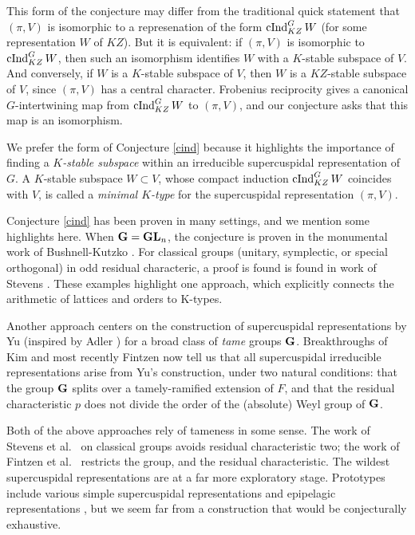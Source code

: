 \documentclass[letter]{amsart}
\theoremstyle{definition}
\theoremstyle{remark}
\numberwithin{thm}{section}
\numberwithin{equation}{section}
\begin{document}
This form of the conjecture may differ from the traditional quick statement that $(\pi, V)$ is isomorphic to a represenation of the form $\operatorname{cInd}_{KZ}^G W$ (for some representation $W$ of $KZ$).  But it is equivalent:  if $(\pi, V)$ is isomorphic to $\operatorname{cInd}_{KZ}^G W$, then such an isomorphism identifies $W$ with a $K$-stable subspace of $V$.  And conversely, if $W$ is a $K$-stable subspace of $V$, then $W$ is a $KZ$-stable subspace of $V$, since $(\pi, V)$ has a central character.  Frobenius reciprocity gives a canonical $G$-intertwining map from $\operatorname{cInd}_{KZ}^G W$ to $(\pi, V)$, and our conjecture asks that this map is an isomorphism.  

We prefer the form of Conjecture \ref{cind} because it highlights the importance of finding a {\em $K$-stable subspace} within an irreducible supercuspidal representation of $G$.  A $K$-stable subspace $W \subset V$, whose compact induction $\operatorname{cInd}_{KZ}^G W$ coincides with $V$, is called a {\em minimal $K$-type} for the supercuspidal representation $(\pi, V)$.

Conjecture \ref{cind} has been proven in many settings, and we mention some highlights here.  When $\boldsymbol{\mathrm{G}} = \boldsymbol{\mathrm{GL}}_n$, the conjecture is proven in the monumental work of Bushnell-Kutzko \cite{BK}.  For classical groups (unitary, symplectic, or special orthogonal) in odd residual characteric, a proof is found is found in work of Stevens \cite{Stevens}.  These examples highlight one approach, which explicitly connects the arithmetic of lattices and orders to K-types.  

Another approach centers on the construction of supercuspidal representations by Yu \cite{JKY} (inspired by Adler \cite{Adler}) for a broad class of {\em tame} groups $\boldsymbol{\mathrm{G}}$.  Breakthroughs of Kim \cite{JLK} and most recently Fintzen \cite{JF} now tell us that all supercuspidal irreducible representations arise from Yu's construction, under two natural conditions:  that the group $\boldsymbol{\mathrm{G}}$ splits over a tamely-ramified extension of $F$, and that the residual characteristic $p$ does not divide the order of the (absolute) Weyl group of $\boldsymbol{\mathrm{G}}$.  

Both of the above approaches rely of tameness in some sense.  The work of Stevens et al.~ on classical groups avoids residual characteristic two; the work of Fintzen et al.~ restricts the group, and the residual characteristic.  The wildest supercuspidal representations are at a far more exploratory stage.  Prototypes include various simple supercuspidal representations \cite{GR} and epipelagic representations \cite{RY}, but we seem far from a construction that would be conjecturally exhaustive.
\end{document}
